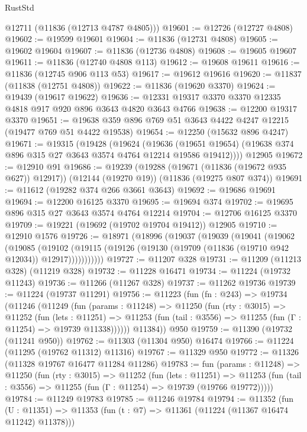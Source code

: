 \begin{lexlean}{RustStd}
\begin{coremodule}
      @12711
      (@11836 (@12713 @4787 @4805)))
@19601 := @12726 (@12727 @4808)
@19602 := @19599 @19601
@19604 := @11836 (@12731 @4808)
@19605 := @19602 @19604
@19607 := @11836 (@12736 @4808)
@19608 := @19605 @19607
@19611 := @11836 (@12740 @4808 @113)
@19612 := @19608 @19611
@19616 := @11836 (@12745 @906 @113 @53)
@19617 := @19612 @19616
@19620 := @11837 (@11838 (@12751 @4808))
@19622 := @11836 (@19620 @3370)
@19624 := @19439 (@19617 @19622)
@19636 := @12331 @19317 @3370 @3370 @12335 @4818 @917 @920 @896 @3643 @4820 @3643 @4766
@19638 := @12200 @19317 @3370
@19651 := @19638 @359 @896 @769 @51 @3643 @4422 @4247 @12215 (@19477 @769 @51 @4422 @19538)
@19654 := @12250 (@15632 @896 @4247)
@19671 := @19315
    (@19428
      (@19624
        (@19636
          (@19651 @19654)
          (@19638 @374 @896 @315 @27 @3643 @3574 @4764 @12214 @19586 @19412))))
    @12905
@19672 := @12910 @91
@19686 := @19239
    (@19288 (@19671 (@11836 (@19672 @935 @627)) @12917))
    (@12144 (@19270 @19))
    (@11836 (@19275 @807 @374))
@19691 := @11612 (@19282 @374 @266 @3661 @3643)
@19692 := @19686 @19691
@19694 := @12200 @16125 @3370
@19695 := @19694 @374
@19702 := @19695 @896 @315 @27 @3643 @3574 @4764 @12214
@19704 := @12706 @16125 @3370
@19709 := @19221 (@19692 (@19702 @19704 @19412)) @12905
@19710 := @12910 @1576
@19726 := @18971
    (@18996
      (@19037
        (@19039
          (@19041
            (@19062
              (@19085
                (@19102
                  (@19115 (@19126 (@19130 (@19709 (@11836 (@19710 @942 @12034)) @12917)))))))))))
@19727 := @11207 @328
@19731 := @11209 (@11213 @328) (@11219 @328)
@19732 := @11228 @16471
@19734 := @11224 (@19732 @11243)
@19736 := @11266 (@11267 @328)
@19737 := @11262 @19736
@19739 := @11224 (@19737 @11291)
@19756 := @11223
    (fun (fn : @243) =>
    @19734
      (@11246
        (@11249
          (fun (params : @11248) =>
          @11250
            (fun (rty : @3015) =>
            @11252
              (fun (lets : @11251) =>
              @11253 (fun (tail : @3556) => @11255 (fun (Γ : @11254) => @19739 @11338))))))
        @11384))
    @950
@19759 := @11390 (@19732 (@11241 @950))
@19762 := @11303 (@11304 @950) @16474
@19766 := @11224 (@11295 (@19762 @11312) @11316)
@19767 := @11329 @950
@19772 := @11326 (@11328 @19767 @16477 @11284 @11286)
@19783 := fun (params : @11248) =>
  @11250
    (fun (rty : @3015) =>
    @11252
      (fun (lets : @11251) =>
      @11253 (fun (tail : @3556) => @11255 (fun (Γ : @11254) => @19739 (@19766 @19772)))))
@19784 := @11249 @19783
@19785 := @11246 @19784
@19794 := @11352
    (fun (U : @11351) => @11353 (fun (t : @7) => @11361 (@11224 (@11367 @16474 @11242) @11378)))

\end{coremodule}
\end{lexlean}
